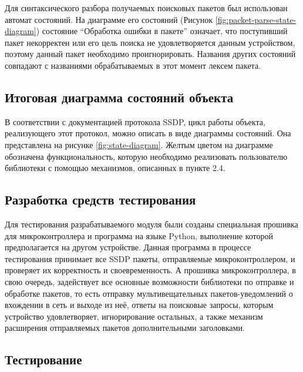 Для синтаксического разбора получаемых поисковых пакетов был использован автомат состояний.
На диаграмме его состояний (Рисунок \ref{fig:packet-parse-state-diagram}) состояние "`Обработка ошибки в пакете"' означает, что поступивший пакет некорректен или его цель поиска не удовлетворяется данным устройством, поэтому данный пакет необходимо проигнорировать.
Названия других состояний совпадают с названиями обрабатываемых в этот момент лексем пакета.


\subsection{Итоговая диаграмма состояний объекта}

В соответствии с документацией протокола SSDP, цикл работы объекта, реализующего этот протокол, можно описать в виде диаграммы состояний.
Она представлена на рисунке \ref{fig:state-diagram}.
Желтым цветом на диаграмме обозначена функциональность, которую необходимо реализовать пользователю библиотеки с помощью механизмов, описанных в пункте 2.4.


\subsection{Разработка средств тестирования}

Для тестирования разрабатываемого модуля были созданы специальная прошивка для микроконтроллера и программа на языке Python, выполнение которой предполагается на другом устройстве.
Данная программа в процессе тестирования принимает все SSDP пакеты, отправляемые микроконтроллером, и проверяет их корректность и своевременность.
А прошивка микроконтроллера, в свою очередь, задействует все основные возможности библиотеки по отправке и обработке пакетов, то есть отправку мультивещательных пакетов-уведомлений о вхождении в сеть и выходе из неё, ответы на поисковые запросы, которым устройство удовлетворяет, игнорирование остальных, а также механизм расширения отправляемых пакетов дополнительными заголовками.

\subsection{Тестирование}

